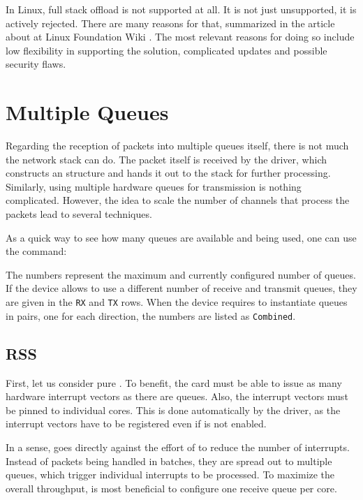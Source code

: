 In Linux, full  stack offload is not supported at all. It is not just
unsupported, it is actively rejected. There are many reasons for that,
summarized in the article about  at Linux Foundation Wiki \cite{lf-toe}.
The most relevant reasons for doing so include low flexibility in supporting
the solution, complicated updates and possible security flaws.

\section{Multiple Queues}

Regarding the reception of packets into multiple queues itself, there is not much
the network stack can do. The packet itself is received by the  driver,
which constructs an \skb{} structure and hands it out to the stack for further
processing. Similarly, using multiple hardware queues for transmission is
nothing complicated. However, the idea to scale the number of channels that
process the packets lead to several techniques.

As a quick way to see how many queues are available and  being used, one can
use the  command:


The numbers represent the maximum and currently configured number of queues. If the
device allows to use a different number of receive and transmit queues, they
are given in the \texttt{RX} and \texttt{TX} rows. When the device requires
to instantiate queues in pairs, one for each direction, the numbers are listed as
\texttt{Combined}.

\subsection{\acrlong{RSS}}

First, let us consider pure . To benefit, the card must
be able to issue as many hardware interrupt vectors as there are queues. Also,
the interrupt vectors must be pinned to individual  cores. This is done
automatically by the  driver, as the interrupt vectors have to be
registered even if  is not enabled.

In a sense,  goes directly against the effort of  to reduce the number of
interrupts. Instead of packets being handled in batches, they are spread out to
multiple queues, which trigger individual interrupts to be processed.
To maximize the overall throughput, is most beneficial to configure one receive queue
per  core.

